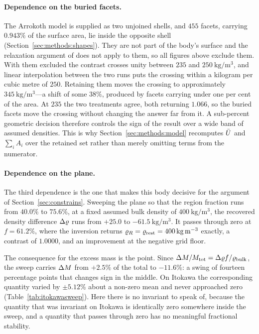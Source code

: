 \paragraph{Dependence on the buried facets.}
The Arrokoth model is supplied as two unjoined shells, and $455$ facets,
carrying $0.943\%$ of the surface area, lie inside the opposite shell
(Section~\ref{sec:methods:shapes}). They are not part of the body's
surface and the relaxation argument of \citet{richardson2014} does not
apply to them, so all figures above exclude them. With them
excluded the contrast crosses unity between $235$ and
$\SI{250}{\kilo\gram\per\cubic\metre}$, and linear interpolation between
the two runs puts the crossing within a kilogram per cubic metre of $250$.
Retaining them moves the crossing to approximately
$\SI{345}{\kilo\gram\per\cubic\metre}$---a shift of some $38\%$,
produced by facets carrying under one per cent of the area. At $235$ the two
treatments agree, both returning $1.066$, so the buried facets move the
crossing without changing the answer far from it.
A sub-percent geometric decision therefore controls the sign of the
result over a wide band of assumed densities. This is why
Section~\ref{sec:methods:model} recomputes $\bar{U}$ and $\sum_i A_i$ over
the retained set rather than merely omitting terms from the numerator.

\paragraph{Dependence on the plane.}
The third dependence is the one that makes this body decisive for the
argument of Section~\ref{sec:constrains}. Sweeping the plane so that the
region fraction runs from $40.0\%$ to $75.6\%$, at a fixed assumed bulk
density of $\SI{400}{\kilo\gram\per\cubic\metre}$, the recovered density
difference $\Delta\varrho$ runs from $+25.0$ to
$\SI{-61.5}{\kilo\gram\per\cubic\metre}$. It passes through zero at
$f = 61.2\%$, where the inversion returns
$\varrho_{R} = \varrho_{\mathrm{rest}} = \SI{400}{\kilo\gram\per\cubic\metre}$ exactly, a
contrast of $1.0000$, and an improvement at the negative grid floor.

The consequence for the excess mass is the point. Since
$\Delta M/M_{\mathrm{tot}} = \Delta\varrho f/\varrho_{\mathrm{bulk}}$, the sweep carries $\Delta M$ from
$+2.5\%$ of the total to $-11.6\%$: a swing of fourteen percentage points
that changes sign in the middle. On Itokawa the corresponding quantity
varied by $\pm5.12\%$ about a non-zero mean and never approached zero
(Table~\ref{tab:itokawasweep}). Here there is no invariant to speak of,
because the quantity that was invariant on Itokawa is identically zero
somewhere inside the sweep, and a quantity that passes through zero has
no meaningful fractional stability.

